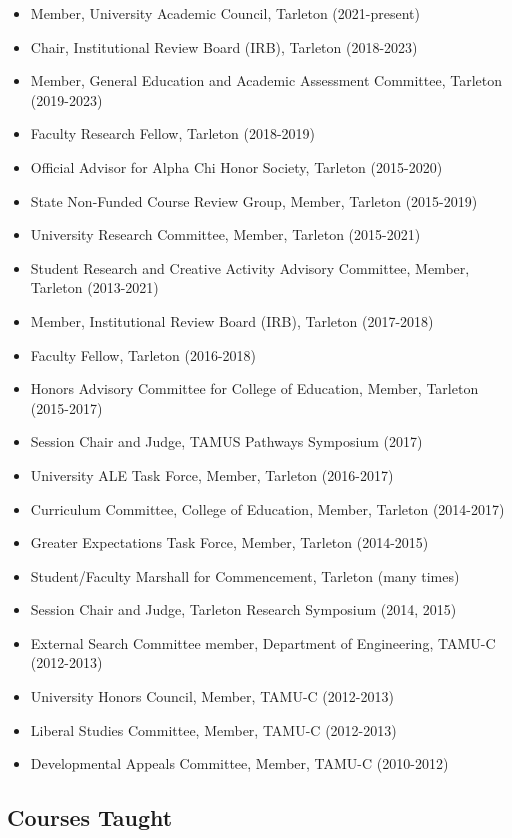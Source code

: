 \documentclass[article,10pt]{article}
\begin{document}
\begin{itemize}
\item Member, University Academic Council, Tarleton (2021-present)
\item Chair, Institutional Review Board (IRB), Tarleton (2018-2023)
\item Member, General Education and Academic Assessment Committee, Tarleton (2019-2023)
\item Faculty Research Fellow, Tarleton (2018-2019)
\item Official Advisor for Alpha Chi Honor Society, Tarleton (2015-2020)
\item State Non-Funded Course Review Group, Member, Tarleton (2015-2019)
\item University Research Committee, Member, Tarleton (2015-2021)
\item Student Research and Creative Activity Advisory Committee, Member, Tarleton (2013-2021)
\item Member, Institutional Review Board (IRB), Tarleton (2017-2018)
\item Faculty Fellow, Tarleton (2016-2018)
\item Honors Advisory Committee for College of Education, Member, Tarleton (2015-2017)
\item Session Chair and Judge, TAMUS Pathways Symposium (2017)
\item University ALE Task Force, Member, Tarleton (2016-2017)
\item Curriculum Committee, College of Education, Member, Tarleton (2014-2017)
\item Greater Expectations Task Force, Member, Tarleton (2014-2015)
\item Student/Faculty Marshall for Commencement, Tarleton (many times)
\item Session Chair and Judge, Tarleton Research Symposium (2014, 2015)
\item External Search Committee member, Department of Engineering, TAMU-C (2012-2013)
\item University Honors Council, Member, TAMU-C (2012-2013)
\item Liberal Studies Committee, Member, TAMU-C (2012-2013)
\item Developmental Appeals Committee, Member, TAMU-C (2010-2012)
\end{itemize}

\subsection*{Courses Taught}
\label{sec:orga302b69}
\end{document}
